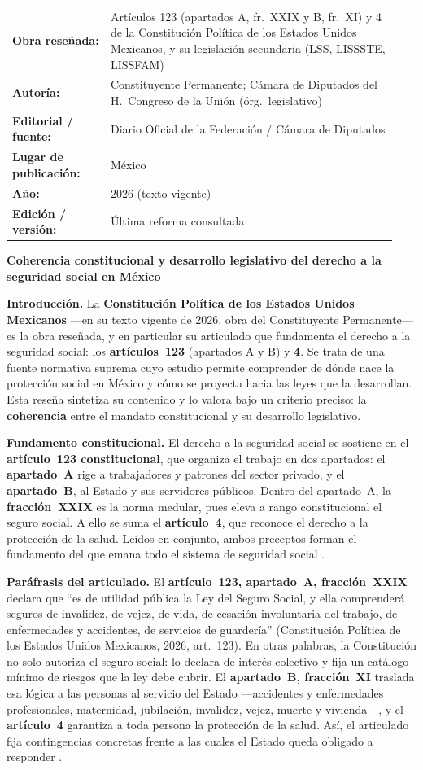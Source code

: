 \documentclass[12pt,letterpaper,oneside]{article}
\makeatletter
\newcommand{\fichabibliografica}[6]{%
  \begin{tcolorbox}[enhanced, colback=unadmRowAlt, colframe=unadmGreen,
    boxrule=0.6pt, arc=1pt, left=8pt, right=8pt, top=5pt, bottom=5pt,
    fonttitle=\bfseries\color{unadmGreenDark}, colbacktitle=unadmRowAlt,
    coltitle=unadmGreenDark, title={Ficha bibliogr\'afica de la obra rese\~nada}]
  {\small
  \begin{tabular}{@{}p{0.24\linewidth}p{0.70\linewidth}@{}}
    \textbf{Obra rese\~nada:} & #1 \\
    \textbf{Autor\'ia:} & #2 \\
    \textbf{Editorial / fuente:} & #3 \\
    \textbf{Lugar de publicaci\'on:} & #4 \\
    \textbf{A\~no:} & #5 \\
    \textbf{Edici\'on / versi\'on:} & #6 \\
  \end{tabular}}
  \end{tcolorbox}}
\makeatother
\begin{document}
\begin{resenabox}
\fichabibliografica
  {Art\'iculos 123 (apartados A, fr.~XXIX y B, fr.~XI) y 4 de la Constituci\'on Pol\'itica de los Estados Unidos Mexicanos, y su legislaci\'on secundaria (LSS, LISSSTE, LISSFAM)}
  {Constituyente Permanente; C\'amara de Diputados del H.\ Congreso de la Uni\'on (\'org.\ legislativo)}
  {Diario Oficial de la Federaci\'on / C\'amara de Diputados}
  {M\'exico}
  {2026 (texto vigente)}
  {\'Ultima reforma consultada}

\medskip
{\large\bfseries\color{unadmGreenDark} Coherencia constitucional y desarrollo legislativo del derecho a la seguridad social en M\'exico\par}
\medskip

\textbf{Introducci\'on.} La \textbf{Constituci\'on Pol\'itica de los Estados Unidos Mexicanos} —en su texto vigente de 2026, obra del Constituyente Permanente— es la obra rese\~nada, y en particular su articulado que fundamenta el derecho a la seguridad social: los \textbf{art\'iculos~123} (apartados A y B) y \textbf{4}. Se trata de una fuente normativa suprema cuyo estudio permite comprender de d\'onde nace la protecci\'on social en M\'exico y c\'omo se proyecta hacia las leyes que la desarrollan. Esta rese\~na sintetiza su contenido y lo valora bajo un criterio preciso: la \textbf{coherencia} entre el mandato constitucional y su desarrollo legislativo.

\textbf{Fundamento constitucional.} El derecho a la seguridad social se sostiene en el \textbf{art\'iculo~123 constitucional}, que organiza el trabajo en dos apartados: el \textbf{apartado~A} rige a trabajadores y patrones del sector privado, y el \textbf{apartado~B}, al Estado y sus servidores p\'ublicos. Dentro del apartado~A, la \textbf{fracci\'on~XXIX} es la norma medular, pues eleva a rango constitucional el seguro social. A ello se suma el \textbf{art\'iculo~4}, que reconoce el derecho a la protecci\'on de la salud. Le\'idos en conjunto, ambos preceptos forman el fundamento del que emana todo el sistema de seguridad social \citep{cpeum2026,bricenoRuiz2011}.

\textbf{Par\'afrasis del articulado.} El \textbf{art\'iculo~123, apartado~A, fracci\'on~XXIX} declara que \enquote{es de utilidad p\'ublica la Ley del Seguro Social, y ella comprender\'a seguros de invalidez, de vejez, de vida, de cesaci\'on involuntaria del trabajo, de enfermedades y accidentes, de servicios de guarder\'ia} (Constituci\'on Pol\'itica de los Estados Unidos Mexicanos, 2026, art.~123). En otras palabras, la Constituci\'on no solo autoriza el seguro social: lo declara de inter\'es colectivo y fija un cat\'alogo m\'inimo de riesgos que la ley debe cubrir. El \textbf{apartado~B, fracci\'on~XI} traslada esa l\'ogica a las personas al servicio del Estado —accidentes y enfermedades profesionales, maternidad, jubilaci\'on, invalidez, vejez, muerte y vivienda—, y el \textbf{art\'iculo~4} garantiza a toda persona la protecci\'on de la salud. As\'i, el articulado fija contingencias concretas frente a las cuales el Estado queda obligado a responder \citep{bricenoRuiz2011}.


\end{resenabox}
\end{document}
